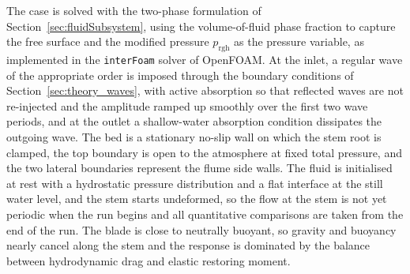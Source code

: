 \noindent
The case is solved with the two-phase formulation of Section~\ref{sec:fluidSubsystem}, using the volume-of-fluid phase fraction to capture the free surface and the modified pressure $p_{\mathrm{rgh}}$ as the pressure variable, as implemented in the \texttt{interFoam} solver of OpenFOAM. At the inlet, a regular wave of the appropriate order is imposed through the boundary conditions of Section~\ref{sec:theory_waves}, with active absorption so that reflected waves are not re-injected \citep{higuera_realistic_2013} and the amplitude ramped up smoothly over the first two wave periods, and at the outlet a shallow-water absorption condition dissipates the outgoing wave. The bed is a stationary no-slip wall on which the stem root is clamped, the top boundary is open to the atmosphere at fixed total pressure, and the two lateral boundaries represent the flume side walls. The fluid is initialised at rest with a hydrostatic pressure distribution and a flat interface at the still water level, and the stem starts undeformed, so the flow at the stem is not yet periodic when the run begins and all quantitative comparisons are taken from the end of the run. The blade is close to neutrally buoyant, so gravity and buoyancy nearly cancel along the stem and the response is dominated by the balance between hydrodynamic drag and elastic restoring moment.

